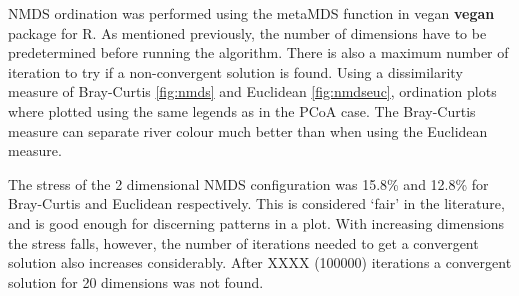 NMDS ordination was performed using the metaMDS function in vegan \textbf{vegan} package for R. As mentioned previously, the number of dimensions have to be predetermined before running the algorithm. There is also a maximum number of iteration to try if a non-convergent solution is found. Using a dissimilarity measure of Bray-Curtis \ref{fig:nmds} and Euclidean \ref{fig:nmdseuc}, ordination plots where plotted using the same legends as in the PCoA case. The Bray-Curtis measure can separate river colour much better than when using the Euclidean measure. 


The stress of the 2 dimensional NMDS configuration was 15.8\% and 12.8\% for Bray-Curtis and Euclidean respectively. This is considered `fair' in the literature, and is good enough for discerning patterns in a plot. With increasing dimensions the stress falls, however, the number of iterations needed to get a convergent solution also increases considerably. After XXXX (100000) iterations a convergent solution for 20 dimensions was not found.  

